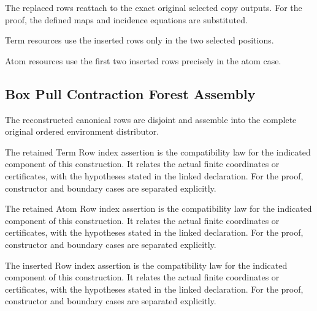 The replaced rows reattach to the exact original selected copy outputs.
For the proof, the defined maps and incidence equations are substituted.
\par{}

Term resources use the inserted rows only in the two selected positions.
\par{}

Atom resources use the first two inserted rows precisely in the atom case.
\par{}

\subsection{Box Pull Contraction Forest Assembly}
The reconstructed canonical rows are disjoint and assemble into the complete original ordered environment distributor.

The retained Term Row index assertion is the compatibility law for the indicated component of this construction. It relates the actual finite coordinates or certificates, with the hypotheses stated in the linked declaration.
For the proof, constructor and boundary cases are separated explicitly.
\par{}

The retained Atom Row index assertion is the compatibility law for the indicated component of this construction. It relates the actual finite coordinates or certificates, with the hypotheses stated in the linked declaration.
For the proof, constructor and boundary cases are separated explicitly.
\par{}

The inserted Row index assertion is the compatibility law for the indicated component of this construction. It relates the actual finite coordinates or certificates, with the hypotheses stated in the linked declaration.
For the proof, constructor and boundary cases are separated explicitly.
\par{}

